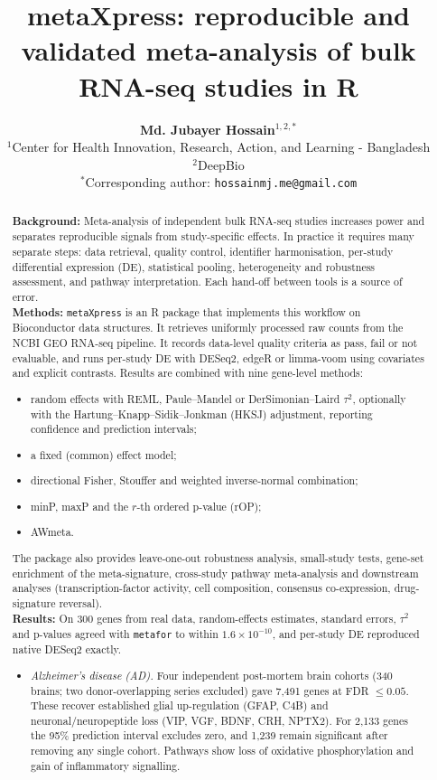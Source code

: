 \documentclass[11pt,a4paper]{article}
\title{\vspace{-1.5cm}\Large\textbf{metaXpress: reproducible and validated meta-analysis of bulk RNA-seq studies in R}\vspace{0.4cm}}
\author{
    \textbf{Md. Jubayer Hossain}$^{1, 2, *}$\\[0.3cm]
    $^{1}$Center for Health Innovation, Research, Action, and Learning - Bangladesh\\
    $^{2}$DeepBio\\[0.2cm]
    $^{*}$\small Corresponding author: \texttt{hossainmj.me@gmail.com}
}
\date{}
\begin{document}
\maketitle

\begin{abstract}
\noindent\textbf{Background:} Meta-analysis of independent bulk RNA-seq studies increases power and separates reproducible signals from study-specific effects. In practice it requires many separate steps: data retrieval, quality control, identifier harmonisation, per-study differential expression (DE), statistical pooling, heterogeneity and robustness assessment, and pathway interpretation. Each hand-off between tools is a source of error.\\
\textbf{Methods:} \texttt{metaXpress} is an R package that implements this workflow on Bioconductor data structures. It retrieves uniformly processed raw counts from the NCBI GEO RNA-seq pipeline. It records data-level quality criteria as pass, fail or not evaluable, and runs per-study DE with DESeq2, edgeR or limma-voom using covariates and explicit contrasts. Results are combined with nine gene-level methods:
\begin{itemize}[noitemsep,topsep=1pt]
    \item random effects with REML, Paule--Mandel or DerSimonian--Laird $\tau^2$, optionally with the Hartung--Knapp--Sidik--Jonkman (HKSJ) adjustment, reporting confidence and prediction intervals;
    \item a fixed (common) effect model;
    \item directional Fisher, Stouffer and weighted inverse-normal combination;
    \item minP, maxP and the $r$-th ordered p-value (rOP);
    \item AWmeta.
\end{itemize}
The package also provides leave-one-out robustness analysis, small-study tests, gene-set enrichment of the meta-signature, cross-study pathway meta-analysis and downstream analyses (transcription-factor activity, cell composition, consensus co-expression, drug-signature reversal).\\
\textbf{Results:} On 300 genes from real data, random-effects estimates, standard errors, $\tau^2$ and p-values agreed with \texttt{metafor} to within $1.6\times10^{-10}$, and per-study DE reproduced native DESeq2 exactly.
\begin{itemize}[noitemsep,topsep=1pt]
    \item \emph{Alzheimer's disease (AD).} Four independent post-mortem brain cohorts (340 brains; two donor-overlapping series excluded) gave 7,491 genes at FDR $\le 0.05$. These recover established glial up-regulation (GFAP, C4B) and neuronal/neuropeptide loss (VIP, VGF, BDNF, CRH, NPTX2). For 2,133 genes the 95\% prediction interval excludes zero, and 1,239 remain significant after removing any single cohort. Pathways show loss of oxidative phosphorylation and gain of inflammatory signalling.

\end{itemize}
\end{abstract}
\end{document}
